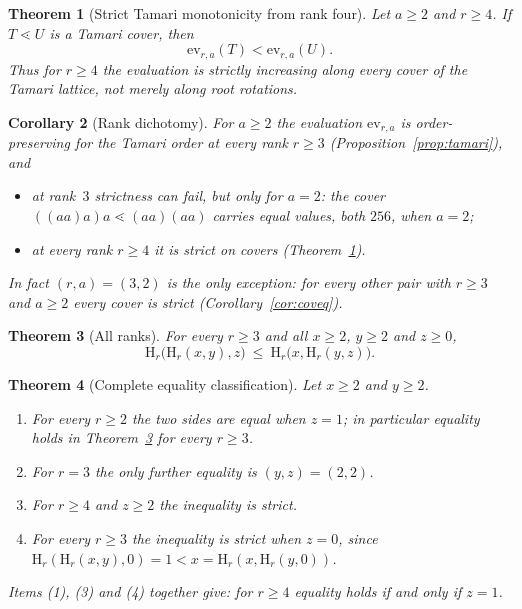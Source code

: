 \documentclass[11pt,a4paper]{article}
\theoremstyle{plain}
\newtheorem{theorem}{Theorem}[section]
\newtheorem{corollary}[theorem]{Corollary}
\theoremstyle{definition}
\newcommand{\HH}{\mathrm{H}}
\newcommand{\ev}{\mathrm{ev}}
\begin{document}
\begin{theorem}[Strict Tamari monotonicity from rank four]\label{thm:strictcover}
Let $a\ge2$ and $r\ge4$. If $T\lessdot U$ is a Tamari cover, then
\[
  \ev_{r,a}(T)<\ev_{r,a}(U).
\]
Thus for $r\ge4$ the evaluation is strictly increasing along \emph{every} cover of the
Tamari lattice, not merely along root rotations.
\end{theorem}

\begin{corollary}[Rank dichotomy]\label{cor:C}
For $a\ge2$ the evaluation $\ev_{r,a}$ is order-preserving for the Tamari order at
every rank $r\ge3$ (Proposition~\ref{prop:tamari}), and
\begin{itemize}
\item at rank~$3$ strictness can fail, but only for $a=2$: the cover
      $((aa)a)a\lessdot(aa)(aa)$ carries equal values, both $256$, when $a=2$;
\item at every rank $r\ge4$ it is strict on covers
      (Theorem~\ref{thm:strictcover}).
\end{itemize}
In fact $(r,a)=(3,2)$ is the only exception: for every other pair with $r\ge3$ and
$a\ge2$ every cover is strict (Corollary~\ref{cor:coveq}).
\end{corollary}

\begin{theorem}[All ranks]\label{thm:D}
For every $r\ge3$ and all $x\ge2$, $y\ge2$ and $z\ge0$,
\[
  \HH_r\bigl(\HH_r(x,y),z\bigr)\ \le\ \HH_r\bigl(x,\HH_r(y,z)\bigr).
\]
\end{theorem}

\begin{theorem}[Complete equality classification]\label{thm:E}
Let $x\ge2$ and $y\ge2$.
\begin{enumerate}
\item For every $r\ge2$ the two sides are equal when $z=1$; in particular equality
      holds in Theorem~\ref{thm:D} for every $r\ge3$.
\item For $r=3$ the only further equality is $(y,z)=(2,2)$.
\item For $r\ge4$ and $z\ge2$ the inequality is \emph{strict}.
\item For every $r\ge3$ the inequality is strict when $z=0$, since
      $\HH_r(\HH_r(x,y),0)=1<x=\HH_r(x,\HH_r(y,0))$.
\end{enumerate}
Items (1), (3) and (4) together give: for $r\ge4$ equality holds if and only if
$z=1$.
\end{theorem}
\end{document}
